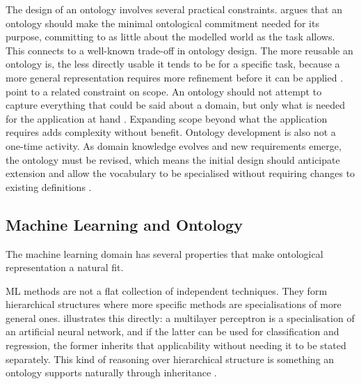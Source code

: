 The design of an ontology involves several practical constraints.
\textcite{gruber1995toward_principles_design_ontologies_used_knowledge_sharing}
argues that an ontology should make the minimal ontological commitment
needed for its purpose, committing to as little
about the modelled world as the task allows. This connects to a
well-known trade-off in ontology design. The more reusable an
ontology is, the less directly usable it tends to be for a specific
task, because a more general representation requires more refinement
before it can be applied
\parencite{studer1998knowledge_engineering_principles_methods}.
\textcite{noy2001ontology_development_101_guide_creating_first_ontology}
point to a related constraint on scope. An ontology should not attempt
to capture everything that could be said about a domain, but only what
is needed for the application at hand
\parencite{noy2001ontology_development_101_guide_creating_first_ontology}.
Expanding scope beyond what the
application requires adds complexity without benefit.
Ontology development is also not a one-time activity. As domain
knowledge evolves and new requirements emerge, the ontology must be
revised, which means the initial design should anticipate extension
and allow the vocabulary to be specialised without requiring changes
to existing definitions
\parencite{gruber1995toward_principles_design_ontologies_used_knowledge_sharing,
noy2001ontology_development_101_guide_creating_first_ontology}.

\subsection{Machine Learning and Ontology}
\label{sec:ml-and-ontology}

The machine learning domain has several properties that make 
ontological representation a natural fit.

ML methods are not a flat collection of independent techniques.
They form hierarchical structures where more specific methods are 
specialisations of more general ones.
\textcite{humm2026industry_ready_machine_learning_ontology} 
illustrates this directly: a multilayer perceptron is a 
specialisation of an artificial neural network, and if the latter 
can be used for classification and regression, the former inherits 
that applicability without needing it to be stated separately.
This kind of reasoning over hierarchical structure is something an 
ontology supports naturally through inheritance 
\parencite{noy2001ontology_development_101_guide_creating_first_ontology}.

